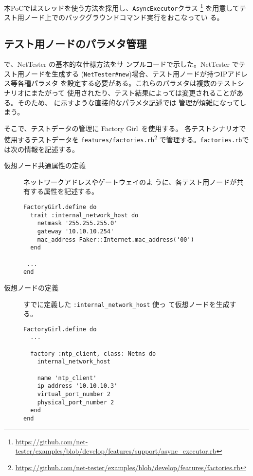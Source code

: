 本PoCではスレッドを使う方法を採用し、\verb|AsyncExecutor|クラス
\footnote{\url{https://github.com/net-tester/examples/blob/develop/features/support/async_executor.rb}}
を用意してテスト用ノード上でのバックグラウンドコマンド実行をおこなってい
る。

  \subsection{テスト用ノードのパラメタ管理}
  \label{sec:test-parameter-management}

で、NetTester の基本的な仕様方法をサ
ンプルコードで示した。NetTester でテスト用ノードを生成する
(\verb|NetTester#new|)場合、テスト用ノードが持つIPアドレス等各種パラメタ
を設定する必要がある。これらのパラメタは複数のテストシナリオにまたがって
使用されたり、テスト結果によっては変更されることがある。そのため、
に示すような直接的なパラメタ記述では
管理が煩雑になってしまう。

そこで、テストデータの管理に Factory Girl~\cite{factory-girl}を使用する。
各テストシナリオで使用するテストデータを
\verb|features/factories.rb|\footnote{\url{https://github.com/net-tester/examples/blob/develop/features/factories.rb}}
で管理する。\verb|factories.rb|では次の情報を記述する。
\begin{description}
 \item[仮想ノード共通属性の定義] ネットワークアドレスやゲートウェイのよ
            うに、各テスト用ノードが共有する属性を記述する。
\begin{lstlisting}
FactoryGirl.define do
  trait :internal_network_host do
    netmask '255.255.255.0'
    gateway '10.10.10.254'
    mac_address Faker::Internet.mac_address('00')
  end

 ...
end
\end{lstlisting}
 \item[仮想ノードの定義] すでに定義した \verb|:internal_network_host| 使っ
            て仮想ノードを生成する。
\begin{lstlisting}
FactoryGirl.define do
  ...

  factory :ntp_client, class: Netns do
    internal_network_host

    name 'ntp_client'
    ip_address '10.10.10.3'
    virtual_port_number 2
    physical_port_number 2
  end
end
\end{lstlisting}
\end{description}

